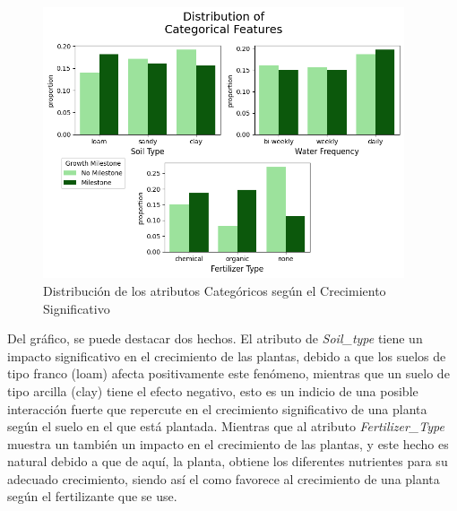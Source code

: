 \documentclass[12pt,a4paper]{article}
\begin{document}
{{            \begin{figure}[hbtp]
                \centering
                \includegraphics[width=0.95\textwidth]{./Resources/3_2.png}
                \caption{Distribución de los atributos Categóricos según el Crecimiento Significativo}
                \label{fig:dist_cat}
            \end{figure}

            Del gráfico, se puede destacar dos hechos. El atributo de \emph{Soil\_type} tiene un 
            impacto significativo en el crecimiento de las plantas, debido a que los suelos de tipo 
            franco (loam) afecta positivamente este fenómeno, mientras que un suelo de tipo arcilla 
            (clay) tiene el efecto negativo, esto es un indicio de una posible interacción fuerte que 
            repercute en el crecimiento significativo de una planta según el suelo en el que está plantada. 
            Mientras que al atributo \emph{Fertilizer\_Type} muestra un también	un impacto en el 
            crecimiento de las plantas, y este hecho es natural debido a que de aquí, la planta, obtiene 
            los diferentes nutrientes para su adecuado crecimiento, siendo así el como favorece 
            al crecimiento de una planta según el fertilizante que se use.
        }

    }
    \newpage
\end{document}
